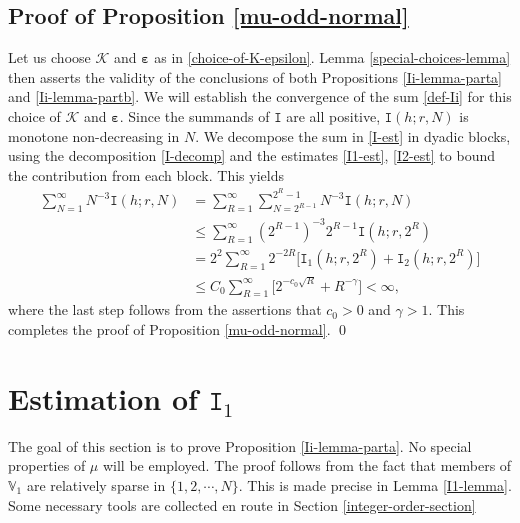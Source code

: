 \documentclass[12pt, twoside]{article}
\theoremstyle{definition}
\numberwithin{equation}{section}
\begin{document}
\subsection{Proof of Proposition \ref{mu-odd-normal}} 
Let us choose $\mathcal K$ and $\pmb{\varepsilon}$ as in \eqref{choice-of-K-epsilon}. Lemma \ref{special-choices-lemma} then asserts the validity of the conclusions of both Propositions \ref{Ii-lemma-parta} and \ref{Ii-lemma-partb}. We will establish the convergence of the sum \eqref{def-Ii} for this choice of $\mathcal K$ and $\pmb{\varepsilon}$.  
\vskip0.1in 
\noindent Since the summands of $\mathtt I$ are all positive, $\mathtt I(h;r, N)$ is monotone non-decreasing in $N$. We decompose the sum in \eqref{I-est} in dyadic blocks, using the decomposition \eqref{I-decomp} and the estimates \eqref{I1-est}, \eqref{I2-est} to bound the contribution from each block. This yields  
\begin{align*}
 \sum_{N=1}^{\infty} N^{-3} \mathtt I(h;r, N) &=  \sum_{R=1}^{\infty} \sum_{N = 2^{R-1}}^{2^R - 1} N^{-3}  \mathtt I(h;r, N) \\ 
 &\leq \sum_{R=1}^{\infty} (2^{R-1})^{-3} 2^{R-1} \mathtt I(h; r, 2^R) \\ 
 & = 2^2 \sum_{R=1}^{\infty} 2^{-2R} \bigl[ \mathtt I_1(h; r, 2^R) + \mathtt I_2(h; r, 2^R) \bigr] \\ 
 &\leq C_0 \sum_{R=1}^{\infty} \bigl[ 2^{-c_0\sqrt{R}} + R^{-\gamma} \bigr] < \infty, 
 \end{align*} 
 where the last step follows from the assertions that $c_0 > 0$ and $\gamma > 1$. This completes the proof of Proposition \ref{mu-odd-normal}.
\qed

\section{Estimation of $\mathtt I_1$} \label{I1-lemma-proof-section} 
The goal of this section is to prove Proposition \ref{Ii-lemma-parta}. No special properties of $\mu$ will be employed. The proof follows from the fact that members of $\mathbb V_1$ are relatively sparse in $\{1, 2, \cdots, N\}$. This is made precise in Lemma \ref{I1-lemma}. Some necessary tools are collected en route in Section \ref{integer-order-section}   
\end{document}
